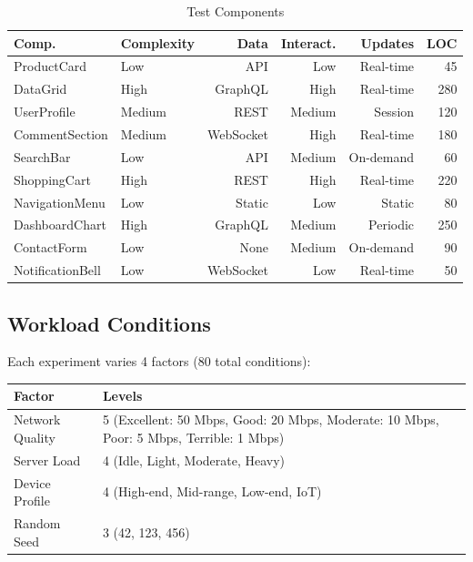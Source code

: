 \documentclass[10pt,twocolumn]{article}
\begin{document}
\begin{table}[t]
\centering
\caption{Test Components}
\label{tab:components}
\small
\begin{tabular}{llrrrr}
\toprule
\textbf{Comp.} & \textbf{Complexity} & \textbf{Data} & \textbf{Interact.} & \textbf{Updates} & \textbf{LOC} \\
\midrule
ProductCard & Low & API & Low & Real-time & 45 \\
DataGrid & High & GraphQL & High & Real-time & 280 \\
UserProfile & Medium & REST & Medium & Session & 120 \\
CommentSection & Medium & WebSocket & High & Real-time & 180 \\
SearchBar & Low & API & Medium & On-demand & 60 \\
ShoppingCart & High & REST & High & Real-time & 220 \\
NavigationMenu & Low & Static & Low & Static & 80 \\
DashboardChart & High & GraphQL & Medium & Periodic & 250 \\
ContactForm & Low & None & Medium & On-demand & 90 \\
NotificationBell & Low & WebSocket & Low & Real-time & 50 \\
\bottomrule
\end{tabular}
\end{table}

\subsection{Workload Conditions}

Each experiment varies 4 factors (80 total conditions):

\begin{table}[h]
\centering
\small
\begin{tabular}{ll}
\toprule
\textbf{Factor} & \textbf{Levels} \\
\midrule
Network Quality & 5 (Excellent: 50 Mbps, Good: 20 Mbps, Moderate: 10 Mbps, Poor: 5 Mbps, Terrible: 1 Mbps) \\
Server Load & 4 (Idle, Light, Moderate, Heavy) \\
Device Profile & 4 (High-end, Mid-range, Low-end, IoT) \\
Random Seed & 3 (42, 123, 456) \\
\bottomrule
\end{tabular}
\end{table}
\end{document}
